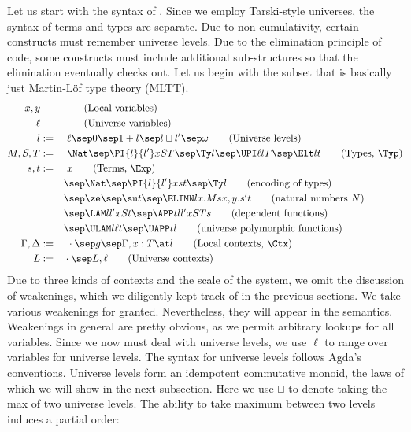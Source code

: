 Let us start with the syntax of \delamlang. %
Since we employ Tarski-style universes, the syntax of terms and types are separate. %
Due to non-cumulativity, certain constructs must remember universe levels. %
Due to the elimination principle of code, some constructs must include additional
sub-structures so that the elimination eventually checks out. %
Let us begin with the subset that is basically just Martin-L\"of type theory (MLTT).
\begin{alignat*}{2}
  x, y & && \tag{Local variables} \\
  \ell & && \tag{Universe variables} \\
  l & := &&\ \ell \sep 0 \sep 1 + l \sep l \sqcup l' \sep \omega \tag{Universe levels} \\
  M, S, T & := && \ \Nat \sep \PI{l}{l'}x S T \sep \Ty l \sep \UPI \ell l T \sep \Elt l t \tag{Types, $\Typ$} \\
  s, t &:=&&\ x \tag{Terms, $\Exp$} \\
  & && \sep \Nat \sep \PI{l}{l'}x s t \sep \Ty l \tag{encoding of types}  \\
  & && \sep \ze \sep \su t \sep \ELIMN l{x.M}{s}{x, y.s'}{t} \tag{natural numbers $N$} \\
       & &&\sep \LAM l{l'} x S t \sep \APP t l{l'} x S T s \tag{dependent functions}  \\
  & && \sep \ULAM l \ell t \sep \UAPP t l \tag{universe polymorphic functions} \\
  \Gamma, \Delta &:= &&\ \cdot \sep g \sep \Gamma, x : T \at l
                        \tag{Local contexts, \Ctx} \\
  L &:= && \cdot \sep L, \ell \tag{Universe contexts}
\end{alignat*}
Due to three kinds of contexts and the scale of the system, we omit the discussion of
weakenings, which we diligently kept track of in the previous sections. %
We take various weakenings for granted. %
Nevertheless, they will appear in the semantics. %
Weakenings in general are pretty obvious, as we permit arbitrary lookups for all
variables. %
Since we now must deal with universe levels, we use $\ell$ to range over variables for
universe levels. %
The syntax for universe levels follows Agda's conventions. %
Universe levels form an idempotent commutative monoid, the laws of which we will show
in the next subsection. %
Here we use $\sqcup$ to denote taking the max of two universe levels. %
The ability to take maximum between two levels induces a partial order:
